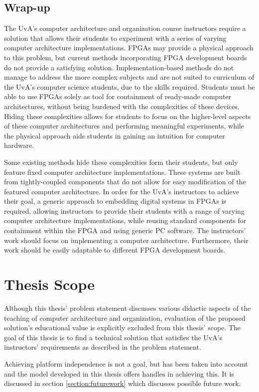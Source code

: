 \documentclass[main.tex]{subfiles}
\begin{document}
\subsection{Wrap-up}
The UvA's computer architecture and organization course instructors require a solution that allows their students to experiment with a series of varying computer architecture implementations. FPGAs may provide a physical approach to this problem, but current methods incorporating FPGA development boards do not provide a satisfying solution. Implementation-based methods do not manage to address the more complex subjects and are not suited to curriculum of the UvA's computer science students, due to the skills required. Students must be able to use FPGAs solely as tool for containment of ready-made computer architectures, without being burdened with the complexities of these devices. Hiding these complexities allows for students to focus on the higher-level aspects of these computer architectures and performing meaningful experiments, while the physical approach aids students in gaining an intuition for computer hardware.

Some existing methods hide these complexities form their students, but only feature fixed computer architecture implementations. These systems are built from tightly-coupled components that do not allow for easy modification of the featured computer architecture. In order for the UvA's instructors to achieve their goal, a generic approach to embedding digital systems in FPGAs is required, allowing instructors to provide their students with a range of varying computer architecture implementations, while reusing standard components for containment within the FPGA and using generic PC software. The instructors' work should focus on implementing a computer architecture. Furthermore, their work should be easily adaptable to different FPGA development boards.

\section{Thesis Scope}
\label{section:scope}
Although this thesis' problem statement discusses various didactic aspects of the teaching of computer architecture and organization, evaluation of the proposed solution's educational value is explicitly excluded from this thesis' scope. The goal of this thesis is to find a technical solution that satisfies the UvA's instructors' requirements as described in the problem statement. 

Achieving platform independence is not a goal, but has been taken into account and the model developed in this thesis offers handles in achieving this. It is discussed in section \ref{section:futurework} which discusses possible future work. 
\end{document}
